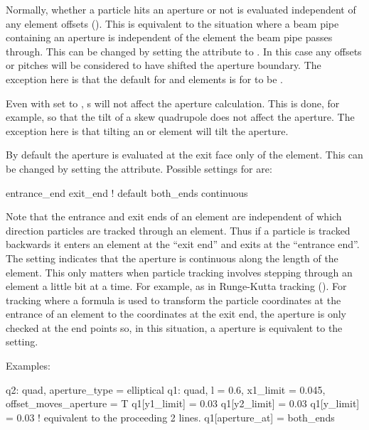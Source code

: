 Normally, whether a particle hits an aperture or not is evaluated
independent of any element offsets (). This is
equivalent to the situation where a beam pipe containing an aperture
is independent of the element the beam pipe passes through. This can
be changed by setting the  attribute to
. In this case any offsets or pitches will be considered to
have shifted the aperture boundary. The exception here is that the
default for  and  elements is for
 to be .

Even with  set to , s will
not affect the aperture calculation. This is done, for example, so
that the tilt of a skew quadrupole does not affect the aperture. The
exception here is that tilting an  or 
element will tilt the aperture.

By default the aperture is evaluated at the exit face only of the
element. This can be changed by setting the  attribute.
Possible settings for  are:
\begin{example}
  entrance_end
  exit_end  ! default
  both_ends
  continuous
\end{example}
Note that the entrance and exit ends of an element are independent of
which direction particles are tracked through an element. Thus if a
particle is tracked backwards it enters an element at the ``exit end''
and exits at the ``entrance end''. The  setting
indicates that the aperture is continuous along the length of the
element. This only matters when particle tracking involves stepping
through an element a little bit at a time. For example, as in
Runge-Kutta tracking (). For tracking where a formula is
used to transform the particle coordinates at the entrance of an
element to the coordinates at the exit end, the aperture is only
checked at the end points so, in this situation, a 
aperture is equivalent to the  setting.

Examples:
\begin{example}
  q2: quad, aperture_type = elliptical  
  q1: quad, l = 0.6, x1_limit = 0.045, offset_moves_aperture = T
  q1[y1_limit] = 0.03
  q1[y2_limit] = 0.03
  q1[y_limit] = 0.03  ! equivalent to the proceeding 2 lines.  
  q1[aperture_at] = both_ends
\end{example}

